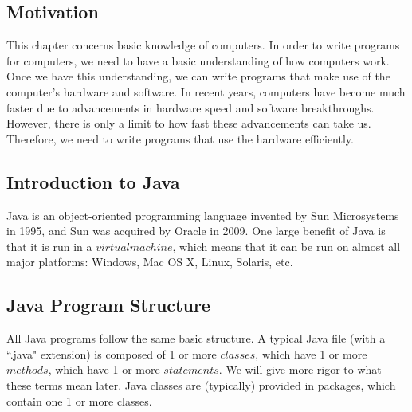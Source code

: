 %
\subsection{Motivation}
This chapter concerns basic knowledge of computers. In order to write programs for computers, we need to have a basic understanding of how computers work. Once we have this understanding, we can write programs that make use of the computer's hardware and software. In recent years, computers have become much faster due to advancements in hardware speed and software breakthroughs. However, there is only a limit to how fast these advancements can take us. Therefore, we need to write programs that use the hardware efficiently.

\subsection{Introduction to Java}
Java is an object-oriented programming language invented by Sun Microsystems in 1995, and Sun was acquired by Oracle in 2009. One large benefit of Java is that it is run in a $virtual machine$, which means that it can be run on almost all major platforms: Windows, Mac OS X, Linux, Solaris, etc. 

\subsection{Java Program Structure}
All Java programs follow the same basic structure. A typical Java file (with a ``.java" extension) is composed of 1 or more $classes$, which have 1 or more $methods$, which have 1 or more $statements$. We will give more rigor to what these terms mean later. Java classes are (typically) provided in packages, which contain one 1 or more classes.

